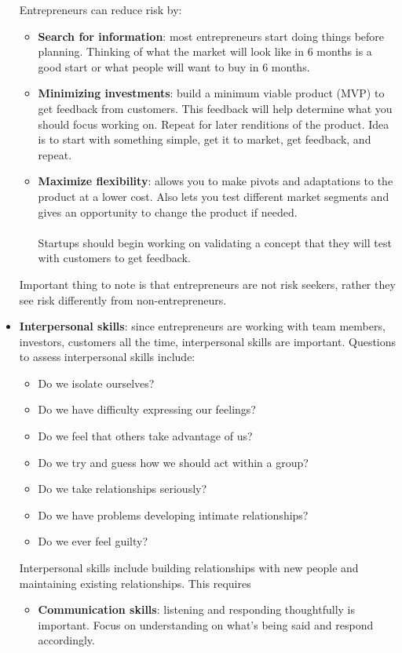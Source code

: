 \documentclass{article}
\begin{document}
\begin{itemize}
      Entrepreneurs can reduce risk by:
      \begin{itemize}
        \item \textbf{Search for information}: most entrepreneurs start doing things before planning. Thinking of what the market will look like in 6 months is a good start or what people will want to buy in 6 months.
        \item \textbf{Minimizing investments}: build a minimum viable product (MVP) to get feedback from customers. This feedback will help determine what you should focus working on. Repeat for later renditions of the product. Idea is to start with something simple, get it to market, get feedback, and repeat.
        \item \textbf{Maximize flexibility}: allows you to make pivots and adaptations to the product at a lower cost. Also lets you test different market segments and gives an opportunity to change the product if needed. \\ \\
        Startups should begin working on validating a concept that they will test with customers to get feedback.
      \end{itemize}
      Important thing to note is that entrepreneurs are not risk seekers, rather they see risk differently from non-entrepreneurs.
    \item \textbf{Interpersonal skills}: since entrepreneurs are working with team members, investors, customers all the time, interpersonal skills are important. Questions to assess interpersonal skills include:
      \begin{itemize}
        \item Do we isolate ourselves?
        \item Do we have difficulty expressing our feelings?
        \item Do we feel that others take advantage of us?
        \item Do we try and guess how we should act within a group?
        \item Do we take relationships seriously?
        \item Do we have problems developing intimate relationships?
        \item Do we ever feel guilty?
      \end{itemize}
      Interpersonal skills include building relationships with new people and maintaining existing relationships. This requires
      \begin{itemize}
        \item \textbf{Communication skills}: listening and responding thoughtfully is important. Focus on understanding on what's being said and respond accordingly.

\end{itemize}
\end{itemize}
\end{document}
